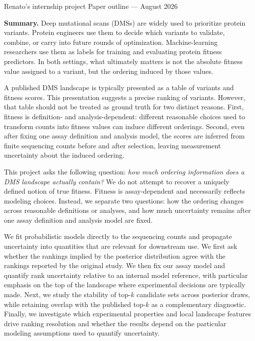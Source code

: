 \documentclass[11pt]{article}
\begin{document}
\thispagestyle{fancy}


\vspace{10pt}
{\color{graytext} Renato's internship project \hfill Paper outline --- August 2026}

\vspace{4pt}

\begin{callout}
\textbf{Summary.}
Deep mutational scans (DMSs) are widely used to prioritize protein variants. Protein engineers use them to decide which variants to validate, combine, or carry into future rounds of optimization. Machine-learning researchers use them as labels for training and evaluating protein fitness predictors. In both settings, what ultimately matters is not the absolute fitness value assigned to a variant, but the ordering induced by those values.

A published DMS landscape is typically presented as a table of variants and fitness scores. This presentation suggests a precise ranking of variants. However, that table should not be treated as ground truth for two distinct reasons. First, fitness is definition- and analysis-dependent: different reasonable choices used to transform counts into fitness values can induce different orderings. Second, even after fixing one assay definition and analysis model, the scores are inferred from finite sequencing counts before and after selection, leaving measurement uncertainty about the induced ordering.

This project asks the following question: \emph{how much ordering information does a DMS landscape actually contain?} We do not attempt to recover a uniquely defined notion of true fitness. Fitness is assay-dependent and necessarily reflects modeling choices. Instead, we separate two questions: how the ordering changes across reasonable definitions or analyses, and how much uncertainty remains after one assay definition and analysis model are fixed.

We fit probabilistic models directly to the sequencing counts and propagate uncertainty into quantities that are relevant for downstream use. We first ask whether the rankings implied by the posterior distribution agree with the rankings reported by the original study. We then fix our assay model and quantify rank uncertainty relative to an internal model reference, with particular emphasis on the top of the landscape where experimental decisions are typically made. Next, we study the stability of top-$k$ candidate sets across posterior draws, while retaining overlap with the published top-$k$ as a complementary diagnostic. Finally, we investigate which experimental properties and local landscape features drive ranking resolution and whether the results depend on the particular modeling assumptions used to quantify uncertainty.


\end{callout}
\end{document}
